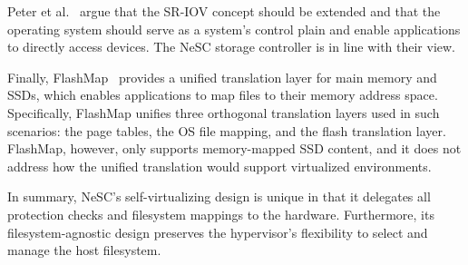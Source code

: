Peter et al.~\cite{peter2016arrakis} 
  argue that the SR-IOV concept should be extended and that the operating system should serve as a system's control plain and enable applications to directly access devices. The NeSC storage controller is in line with their view.


Finally, FlashMap~\cite{huang2015unified} provides a unified translation layer for main memory and SSDs, which enables applications to map files to their memory address space. Specifically, FlashMap unifies three orthogonal translation layers used in such scenarios: the page tables, the OS file mapping, and the flash translation layer.
FlashMap, however, only supports memory-mapped SSD content, and it does not address how the unified translation would support virtualized environments.

In summary, NeSC's self-virtualizing design is unique in that it delegates all protection checks and filesystem mappings to the hardware. Furthermore, its  filesystem-agnostic design preserves the hypervisor's flexibility to select and manage the host filesystem.



